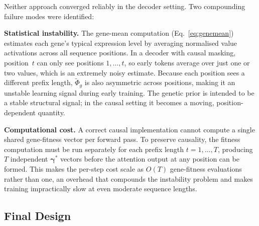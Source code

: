 \documentclass[10pt, a4paper, twocolumn]{article}
\begin{document}
Neither approach converged reliably in the decoder setting. Two compounding failure modes were identified:

\textbf{Statistical instability.} The gene-mean computation (Eq.~\eqref{eq:genemean}) estimates each gene's typical expression level by averaging normalised value activations across all sequence positions. In a decoder with causal masking, position~$t$ can only see positions $1,\ldots,t$, so early tokens average over just one or two values, which is an extremely noisy estimate. Because each position sees a different prefix length, $\tilde{\Phi}_g$ is also asymmetric across positions, making it an unstable learning signal during early training. The genetic prior is intended to be a stable structural signal; in the causal setting it becomes a moving, position-dependent quantity.

\textbf{Computational cost.} A correct causal implementation cannot compute a single shared gene-fitness vector per forward pass. To preserve causality, the fitness computation must be run separately for each prefix length $t = 1, \ldots, T$, producing $T$ independent $\boldsymbol{\gamma}^*$ vectors before the attention output at any position can be formed. This makes the per-step cost scale as $O(T)$ gene-fitness evaluations rather than one, an overhead that compounds the instability problem and makes training impractically slow at even moderate sequence lengths.

\subsection*{Final Design}
\end{document}
